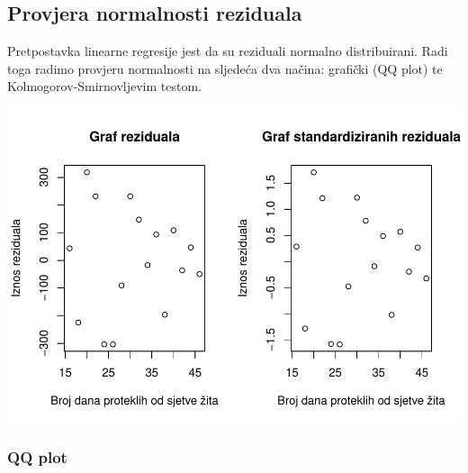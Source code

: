 \documentclass[]{article}
\newenvironment{Shaded}{\begin{snugshade}}{\end{snugshade}}
\newcommand{\KeywordTok}[1]{\textcolor[rgb]{0.13,0.29,0.53}{\textbf{{#1}}}}
\newcommand{\DataTypeTok}[1]{\textcolor[rgb]{0.13,0.29,0.53}{{#1}}}
\newcommand{\DecValTok}[1]{\textcolor[rgb]{0.00,0.00,0.81}{{#1}}}
\newcommand{\StringTok}[1]{\textcolor[rgb]{0.31,0.60,0.02}{{#1}}}
\newcommand{\NormalTok}[1]{{#1}}
\begin{document}
\subsection{Provjera normalnosti
reziduala}\label{provjera-normalnosti-reziduala-1}

Pretpostavka linearne regresije jest da su reziduali normalno
distribuirani. Radi toga radimo provjeru normalnosti na sljedeća dva
načina: grafički (QQ plot) te Kolmogorov-Smirnovljevim testom.

\begin{Shaded}
\end{Shaded}

\includegraphics{Izvjestaj_files/figure-latex/unnamed-chunk-20-1.pdf}

\subsubsection{QQ plot}\label{qq-plot-2}
\end{document}
